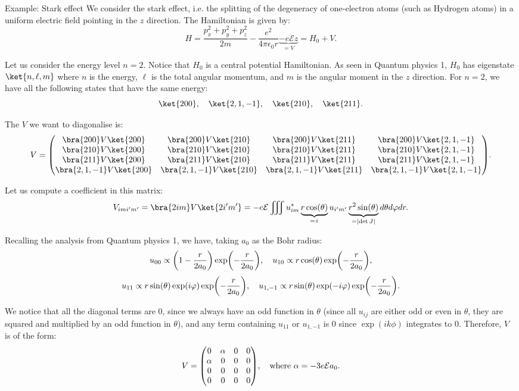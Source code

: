 \documentclass[a4paper]{article}
\begin{document}
\begin{parag}{Example: Stark effect}
    We consider the stark effect, i.e. the splitting of the degeneracy of one-electron atoms (such as Hydrogen atoms) in a uniform electric field pointing in the $z$ direction. The Hamiltonian is given by: 
    \[H = \frac{p_x^2 + p_y^2 + p_z^2}{2m} - \frac{e^2}{4 \pi \epsilon_0 r} \underbrace{- e \mathcal{E} z}_{= V} = H_0 + V.\]
    
    Let us consider the energy level $n = 2$. Notice that $H_0$ is a central potential Hamiltonian. As seen in Quantum physics 1, $H_0$ has eigenstate $\ket{n, \ell, m}$ where $n$ is the energy, $\ell$ is the total angular momentum, and $m$ is the angular moment in the $z$ direction. For $n = 2$, we have all the following states that have the same energy: 
    \[\ket{200}, \mathspace \ket{2,1,-1}, \mathspace \ket{210}, \mathspace \ket{211}.\]

    The $V$ we want to diagonalise is: 
    \[V = \begin{pmatrix} \bra{200}V \ket{200} & \bra{200}V \ket{210} & \bra{200} V \ket{211} & \bra{200} V \ket{2, 1, -1} \\ \bra{210} V \ket{200} & \bra{210} V \ket{210} & \bra{210} V \ket{211} & \bra{210} V \ket{2, 1, -1} \\ \bra{211} V \ket{200} & \bra{211} V \ket{210} & \bra{211} V \ket{211} & \bra{211} V \ket{2, 1, -1} \\ \bra{2, 1, -1} V \ket{200} & \bra{2, 1, -1} V \ket{210} & \bra{2, 1, -1} V \ket{211} & \bra{2, 1, -1} V \ket{2, 1, -1} \end{pmatrix} .\]

    Let us compute a coefficient in this matrix: 
    \[V_{imi'm'} = \bra{2im} V \ket{2i'm'} = -e \mathcal{E} \iiint u_{im}^* \underbrace{r \cos\left(\theta\right)}_{= z} u_{i' m'} \underbrace{r^2 \sin\left(\theta\right)}_{= \left|\det J\right|} d \theta d \phi dr.\]

    Recalling the analysis from Quantum physics 1, we have, taking $a_0$ as the Bohr radius: 
    \[u_{00} \propto \left(1 - \frac{r}{2 a_0}\right) \exp\left(-\frac{r}{2 a_0}\right), \mathspace u_{10} \propto r \cos\left(\theta\right) \exp\left(-\frac{r}{2 a_0}\right),\] 
    \[u_{11} \propto r \sin\left(\theta\right) \exp\left(i \phi\right) \exp\left(-\frac{r}{2 a_0}\right), \mathspace u_{1, -1} \propto r \sin\left(\theta\right) \exp\left(-i \phi\right) \exp\left(-\frac{r}{2 a_0}\right).\]

    We notice that all the diagonal terms are 0, since we always have an odd function in $\theta$ (since all $u_{ij}$ are either odd or even in $\theta$, they are squared and multiplied by an odd function in $\theta$), and any term containing $u_{11}$ or $u_{1, -1}$ is 0 since $\exp\left(ik \phi\right)$ integrates to 0. Therefore, $V$ is of the form: 
    \[V = \begin{pmatrix} 0 & \alpha & 0 & 0 \\ \alpha & 0 & 0 & 0 \\ 0 & 0 & 0 & 0 \\ 0 & 0 & 0 & 0 \end{pmatrix}, \mathspace \text{where } \alpha = - 3 e \mathcal{E} a_0.\]
    

\end{parag}
\end{document}
